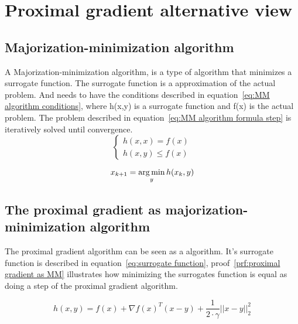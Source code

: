 \section{Proximal gradient alternative view}
	\subsection{Majorization-minimization algorithm}
	A Majorization-minimization algorithm, is a type of algorithm that minimizes a surrogate function. The surrogate function is a approximation of the actual problem. And needs to have the conditions described in equation~\ref{eq:MM algorithm conditions}, where h(x,y) is a surrogate function and f(x) is the actual problem. The problem described in equation~\ref{eq:MM algorithm formula step} is iteratively solved until convergence.
	\begin{equation}
		\begin{cases}
			h(x,x) = f(x) \\
			h(x,y) \leq f(x)
		\end{cases}
		\label{eq:MM algorithm conditions}
	\end{equation}
	
	\begin{equation}
		x_{k+1} = \operatorname*{arg\,min}_y h(x_k,y)
		\label{eq:MM algorithm formula step}
	\end{equation}

	\subsection{The proximal gradient as majorization-minimization algorithm}
	The proximal gradient algorithm can be seen as a algorithm. It's surrogate function is described in equation~\ref{eq:surrogate function}, proof~\ref{prf:proximal gradient as MM} illustrates how minimizing the surrogates function is equal as doing a step of the proximal gradient algorithm.
	
	\begin{equation}
		h(x,y) = f(x) + \nabla f(x)^T(x-y) + \frac{1}{2 \cdot \gamma}||x-y||^2_2
		\label{eq:surrogate function}
	\end{equation}
	
